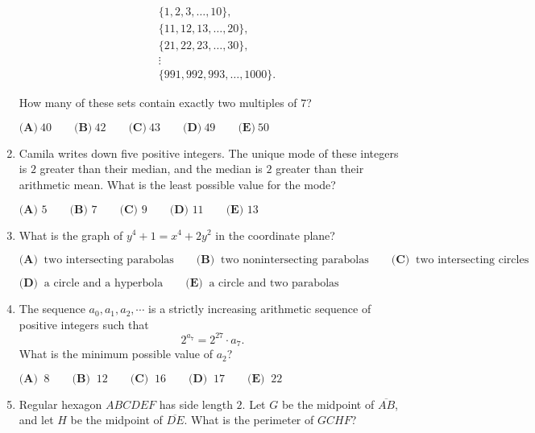 \documentclass{article}
\begin{document}
\begin{enumerate}[label=\arabic*., itemsep=0.5em]
\begin{align*}
&\{1,2,3,\ldots,10\}, \\
&\{11,12,13,\ldots,20\},\\
&\{21,22,23,\ldots,30\},\\
&\vdots\\
&\{991,992,993,\ldots,1000\}.
\end{align*}

How many of these sets contain exactly two multiples of \(7\)?

\(\textbf{(A)}\ 40\qquad\textbf{(B)}\ 42\qquad\textbf{(C)}\ 43\qquad\textbf{(D)}\ 49\qquad\textbf{(E)}\ 50\)\par \vspace{0.5em}\item Camila writes down five positive integers. The unique mode of these integers is \(2\) greater than their median, and the median is \(2\) greater than their arithmetic mean. What is the least possible value for the mode?

\(\textbf{(A) }5\qquad\textbf{(B) }7\qquad\textbf{(C) }9\qquad\textbf{(D) }11\qquad\textbf{(E) }13\)\par \vspace{0.5em}\item What is the graph of \(y^4+1=x^4+2y^2\) in the coordinate plane?

\(\textbf{(A) }\ \text{two intersecting parabolas} \qquad \textbf{(B) }\ \text{two nonintersecting parabolas} \qquad \textbf{(C) }\ \text{two intersecting circles} \qquad\)

\(\textbf{(D) }\ \text{a circle and a hyperbola} \qquad \textbf{(E) }\ \text{a circle and two parabolas}\)\par \vspace{0.5em}\item The sequence \(a_0,a_1,a_2,\cdots\) is a strictly increasing arithmetic sequence of positive integers such that 
\begin{equation*}
2^{a_7}=2^{27} \cdot a_7.
\end{equation*}
 What is the minimum possible value of \(a_2\)?

\(\textbf{(A) }\ 8 \qquad \textbf{(B) }\ 12 \qquad \textbf{(C) }\ 16 \qquad \textbf{(D) }\ 17 \qquad \textbf{(E) }\ 22\)\par \vspace{0.5em}\item Regular hexagon \(ABCDEF\) has side length \(2\). Let \(G\) be the midpoint of \(\overline{AB}\), and let \(H\) be the midpoint of \(\overline{DE}\). What is the perimeter of \(GCHF\)?


\end{enumerate}
\end{document}
